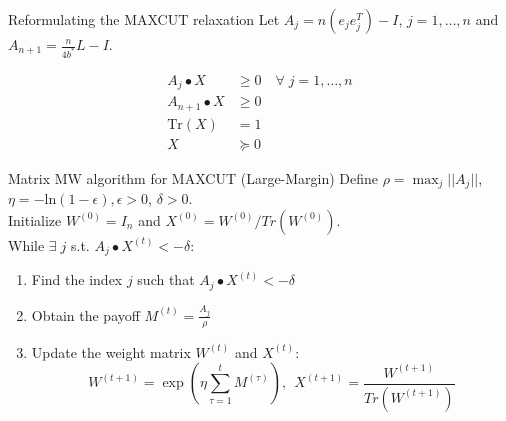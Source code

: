 \documentclass{beamer}
\begin{document}

\begin{frame}{Reformulating the MAXCUT relaxation}
Let $A_j = n(e_je_j^T) - I$, $j = 1, \dots, n$ and $A_{n+1} = \frac{n}{4b^*} L - I$. 

\begin{align*}
A_j \bullet X &\geq 0 \quad \forall \; j = 1,\ldots,n \\
A_{n+1} \bullet X &\geq 0 \\
\text{Tr}(X) &= 1 \\
X &\succcurlyeq 0
\end{align*}
\end{frame}


\begin{frame}{Matrix MW algorithm for MAXCUT (Large-Margin)}
Define $\rho = \max_j ||A_j||$, $\eta = -\text{ln}(1-\epsilon), \epsilon > 0$, $\delta > 0$. \\ \vspace{.5cm}
Initialize $W^{(0)} = I_n$ \quad and $X^{(0)} = W^{(0)}/Tr(W^{(0)})$. \\ \vspace{.5cm}
While $\exists \; j$ s.t. $A_j \bullet X^{(t)} < -\delta$:
\begin{enumerate}
\setlength\itemsep{1.2em}
\item Find the index $j$ such that $A_j \bullet X^{(t)} < -\delta$
\item Obtain the payoff $M^{(t)} = \frac{A_j}{\rho}$
\item Update the weight matrix $W^{(t)}$ and $X^{(t)}$:
$$ W^{(t+1)} = \exp \left(\eta \sum_{\tau =1}^t M^{(\tau)}\right) ,\ \ X^{(t+1)} = \frac{W^{(t+1)}}{Tr(W^{(t+1)})}$$

\end{enumerate}
\end{frame}
\end{document}
